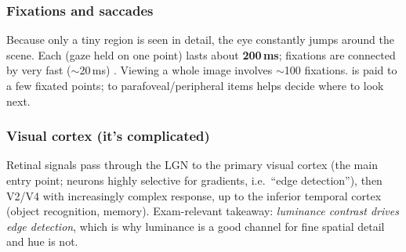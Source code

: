 \subsubsection{Fixations and saccades}
Because only a tiny region is seen in detail, the eye constantly jumps around
the scene. Each  (gaze held on one point) lasts about
\textbf{200\,ms}; fixations are connected by very fast ($\sim$20\,ms)
. Viewing a whole image involves $\sim$100 fixations.
 is paid to a few fixated points;  to parafoveal/peripheral items helps decide where to look next.

\subsubsection{Visual cortex (it's complicated)}
Retinal signals pass through the LGN to the primary visual cortex 
(the main entry point; neurons highly selective for gradients, i.e.\ ``edge
detection''), then V2/V4 with increasingly complex response, up to the inferior
temporal cortex (object recognition, memory). Exam-relevant takeaway:
\emph{luminance contrast drives edge detection}, which is why luminance is a
good channel for fine spatial detail and hue is not.

